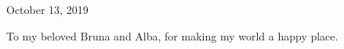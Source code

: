 \begin{titlepage}
\begin{center}
\begin{bottompar}


{\large October 13, 2019}\\[2cm] %
\end{bottompar}
\end{center}
\end{titlepage}

\setcounter{tocdepth}{2}
\tableofcontents
\pagebreak


\clearpage
\begin{center}
    \thispagestyle{empty}
    \vspace*{\fill}
    To my beloved Bruna and Alba, for making my world a happy place.
    \vspace*{\fill}
\end{center}

\pagebreak